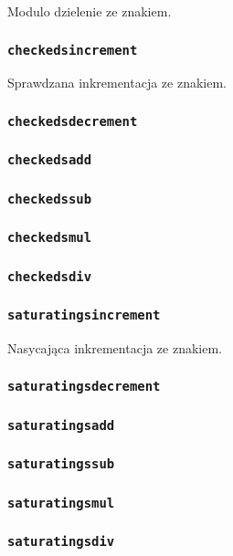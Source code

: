 Modulo dzielenie ze znakiem.

\subsubsection{\texttt{checkedsincrement}}

Sprawdzana inkrementacja ze znakiem.

\subsubsection{\texttt{checkedsdecrement}}
\subsubsection{\texttt{checkedsadd}}
\subsubsection{\texttt{checkedssub}}
\subsubsection{\texttt{checkedsmul}}
\subsubsection{\texttt{checkedsdiv}}

\subsubsection{\texttt{saturatingsincrement}}

Nasycająca inkrementacja ze znakiem.

\subsubsection{\texttt{saturatingsdecrement}}
\subsubsection{\texttt{saturatingsadd}}
\subsubsection{\texttt{saturatingssub}}
\subsubsection{\texttt{saturatingsmul}}
\subsubsection{\texttt{saturatingsdiv}}

